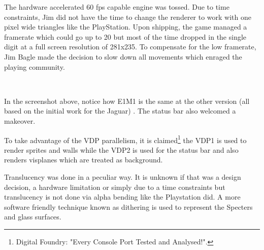The hardware accelerated 60 fps capable engine was tossed. Due to time constraints, Jim did not have the time to change the renderer to work with one pixel wide triangles like the PlayStation. Upon shipping, the game managed a framerate which could go up to 20 but most of the time dropped in the single digit at a full screen resolution of 281x235. To compensate for the low framerate, Jim Bagle made the decision to slow down all movements which enraged the playing community.\\
\par
{}







\\
\par
In the screenshot above, notice how E1M1 is the same at the other version (all based on the initial work for the Jaguar) . The status bar also welcomed a makeover.\\
\par
To take advantage of the VDP parallelism, it is claimed\footnote{Digital Foundry: "Every Console Port Tested and Analysed!".} the VDP1 is used to render sprites and walls while the VDP2 is used for the status bar and also renders visplanes which are treated as background.\\
\par 
Translucency was done in a peculiar way. It is unknown if that was a design decision, a hardware limitation or simply due to a time constraints but translucency is not done via alpha bending like the Playstation did. A more software friendly technique known as dithering is used to represent the Specters and glass surfaces.







\par
{}


\vspace{-10pt}
\par
{}





